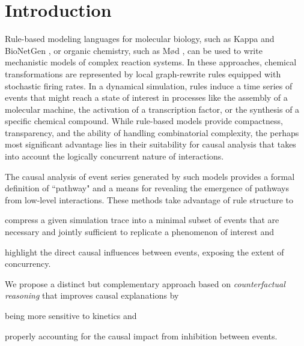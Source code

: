 
\section*{Introduction}\label{sec:intro}

Rule-based modeling languages for molecular biology, such as Kappa
\cite{DanosEtAl-CONCUR07} and BioNetGen \cite{bngl}, or organic
chemistry, such as M{\o}d \cite{moll}, can be used to write
mechanistic models of complex reaction systems. In these approaches,
chemical transformations are represented by local graph-rewrite rules
equipped with stochastic firing rates. In a dynamical simulation,
rules induce a time series of events that might reach a state of
interest in processes like the assembly of a molecular machine, the
activation of a transcription factor, or the synthesis of a specific
chemical compound. While rule-based models provide compactness,
transparency, and the ability of handling combinatorial complexity,
the perhaps most significant advantage lies in their suitability for
causal analysis that takes into account the logically concurrent
nature of interactions.

%

The causal analysis
\cite{DBLP:conf/fsttcs/DanosFFHH12,DanosEtAl-CONCUR07} of event series
generated by such models provides a formal definition of ``pathway"
and a means for revealing the emergence of pathways from low-level
interactions. These methods take advantage of rule structure to
\begin{inparaenum}[(i)]
\item compress a given simulation trace into a minimal subset of
  events that are necessary and jointly sufficient to replicate a
  phenomenon of interest and
\item highlight the direct causal influences between events, exposing
  the extent of concurrency.
\end{inparaenum}


We propose a distinct but complementary approach based on
\textit{counterfactual reasoning} that improves causal explanations by
\begin{inparaenum}[(i)]
\item being more sensitive to kinetics and
\item properly accounting for the causal impact from inhibition
  between events.
\end{inparaenum}